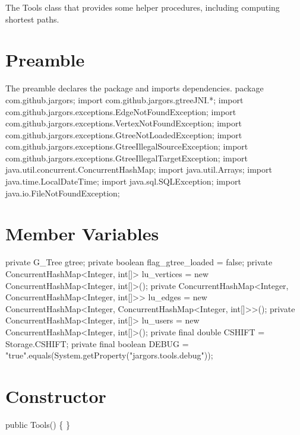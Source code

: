 The Tools class that provides some helper procedures, including computing
shortest paths.

\section{Preamble}
The preamble declares the package and imports dependencies.
\nwenddocs{}\endmoddef{}
package com.github.jargors;
import com.github.jargors.gtreeJNI.*;
import com.github.jargors.exceptions.EdgeNotFoundException;
import com.github.jargors.exceptions.VertexNotFoundException;
import com.github.jargors.exceptions.GtreeNotLoadedException;
import com.github.jargors.exceptions.GtreeIllegalSourceException;
import com.github.jargors.exceptions.GtreeIllegalTargetException;
import java.util.concurrent.ConcurrentHashMap;
import java.util.Arrays;
import java.time.LocalDateTime;
import java.sql.SQLException;
import java.io.FileNotFoundException;
\nwendcode{}\nwdocspar

\section{Member Variables}
\nwenddocs{}\endmoddef{}
private G_Tree gtree;
private boolean flag_gtree_loaded = false;
private ConcurrentHashMap<Integer, int[]> lu_vertices = new ConcurrentHashMap<Integer, int[]>();
private ConcurrentHashMap<Integer,
    ConcurrentHashMap<Integer, int[]>>    lu_edges    = new ConcurrentHashMap<Integer, ConcurrentHashMap<Integer, int[]>>();
private ConcurrentHashMap<Integer, int[]> lu_users    = new ConcurrentHashMap<Integer, int[]>();
private final double CSHIFT = Storage.CSHIFT;
private final boolean DEBUG = "true".equals(System.getProperty("jargors.tools.debug"));
\nwendcode{}\nwdocspar

\section{Constructor}
\nwenddocs{}\endmoddef{}
public Tools() \{ \}
\nwendcode{}\nwdocspar


